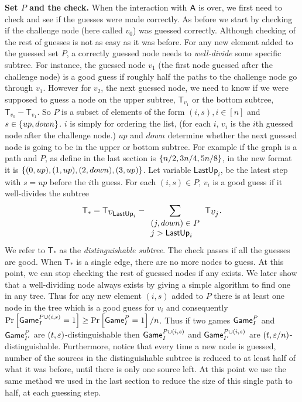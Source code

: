 \documentclass{article}
\def\A{{\sf A}}
\newcommand{\game}{{\sf Game}}
\newcommand{\T}{{\mathsf T}}
\newcommand{\dgg}[2]{\game_{#1}^{#2}}
\newcommand{\lastup}{{\mathsf {LastUp}}}
\newcommand{\lastdown}{{\mathsf {LastDown}}}
\newcommand{\bigv}[1]{\mbox{\large $v_{#1}$}}
\begin{document}
\noindent \textbf{Set $P$ and the check.} When the interaction with $\A$ is over, we first need to check and see if the guesses were made correctly. As before we start by checking if the challenge node (here called $v_0$) was guessed correctly. Although checking of the rest of guesses is not as easy as it was before. For any new element added to the guessed set $P$, a correctly guessed node needs to \textit{well-divide} some specific subtree. For instance, the guessed node $v_1$ (the first node guessed after the challenge node) is a good guess if roughly half the paths to the challenge node go through $v_1$. However for $v_2$, the next guessed node, we need to know if we were supposed to guess a node on the upper subtree, $\T_{v_1}$ or the bottom subtree, $\T_{v_0}-\T_{v_1}$. So $P$ is a subset of elements of the form $(i,s), i\in [n]$ and $s \in \left\{ up,down \right\}$. $i$ is simply for ordering the list, (for each $i$, $v_i$ is the $i$th guessed node after the challenge node.) $up$ and $down$ determine whether the next guessed node is going to be in the upper or bottom subtree. For example if the graph is a path and $P$, as define in the last section is $\left\{ n/2,3n/4,5n/8 \right\}$, in the new format it is $\left\{ (0,up),(1,up), (2,down), (3,up) \right\}$. Let variable $\lastup_i$, be the latest step with $s=up$ before the $i$th guess. For each $(i,s)\in P$, $v_i$ is a good guess if it well-divides the subtree 
$$ \T_*=\T_{\bigv{\lastup_i}}-\sum_{\begin{array}{l}(j,down)\in P \\ j>\lastup_i \end{array}} \T_{\bigv{j}}.$$  We refer to $\T_*$ as the \textit{distinguishable subtree}. The check passes if all the guesses are good. When $\T_*$ is a single edge, there are no more nodes to guess. At this point, we can stop checking the rest of guessed nodes if any exists. \iffalse if we still need to make a guess for some element in $(i,s)\in P$, we use the symbol $\null$ to represent that there are no more nodes in the subtree and we do not update $\lastup$ and $\lastdown$ anymore. Clearly for all $i<j\leq m$ $v_j=\null$ where $m$ is the size of $P$.\fi We later show that a well-dividing node always exists by giving a simple algorithm to find one in any tree. Thus for any new element $(i,s)$ added to $P$ there is at least one node in the tree which is a good guess for $v_i$ and consequently $\prob{\game_{I}^{P\cup (i,s) }=1}\geq \prob{\dgg{I}{P}=1}/n$. Thus if two games $ \dgg{I}{P}$ and $\dgg{I'}{P}$ are $(t,\varepsilon)$-distinguishable then $ \game_{I}^{P\cup (i,s) }$ and $\game_{I'}^{P\cup (i,s) }$ are $(t,\varepsilon/n)$-distinguishable. Furthermore, notice that every time a new node is guessed, number of the sources in the distinguishable subtree is reduced to at least half of what it was before, until there is only one source left. At this point we use the same method we used in the last section to reduce the size of this single path to half, at each guessing step. \\
\end{document}
